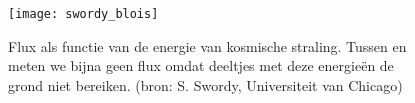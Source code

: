 \begin{figure} 
    \centering 
    \texttt{[image: swordy\_blois]}
    \caption{Flux als functie van de energie van kosmische straling. Tussen
     en  \electronvolt meten we bijna geen flux omdat deeltjes met deze
energieën de grond niet bereiken. (bron: S. Swordy, Universiteit van
Chicago)} 
    \label{fig:swordy_blois} 
\end{figure}




